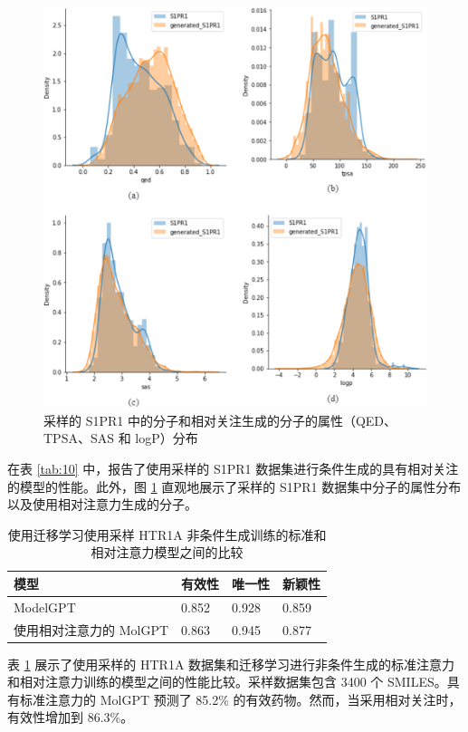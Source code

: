 \begin{figure}[H]
  \centering
  \includegraphics[width=\linewidth]{figures/7.png}
  \caption{采样的 S1PR1 中的分子和相对关注生成的分子的属性（QED、TPSA、SAS 和 logP）分布}
  \label{fig:7}
\end{figure}

在表 \ref{tab:10} 中，报告了使用采样的 S1PR1 数据集进行条件生成的具有相对关注的模型的性能。此外，图 \ref{fig:7} 直观地展示了采样的 S1PR1 数据集中分子的属性分布以及使用相对注意力生成的分子。

\begin{table}[H]
  \centering
  \caption{使用迁移学习使用采样 HTR1A 非条件生成训练的标准和相对注意力模型之间的比较}
  \label{tab:11}
  \begin{tabular}{llll}
    \hline 模型 & 有效性 & 唯一性 & 新颖性 \\
    \hline ModelGPT & 0.852 & 0.928 & 0.859 \\
    使用相对注意力的 MolGPT & 0.863 & 0.945 & 0.877 \\
    \hline
    \end{tabular}
\end{table}

表 \ref{tab:11} 展示了使用采样的 HTR1A 数据集和迁移学习进行非条件生成的标准注意力和相对注意力训练的模型之间的性能比较。采样数据集包含 3400 个 SMILES。具有标准注意力的 MolGPT 预测了 85.2\% 的有效药物。然而，当采用相对关注时，有效性增加到 86.3\%。

